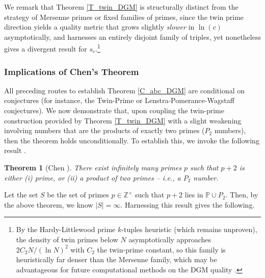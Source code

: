 \documentclass[11pt,letterpaper]{amsart}
\newtheorem{theorem}{Theorem}[section]
\def\Z{\mathbb{Z}}
\def\Z{\mathbb{Z}}
\begin{document}
We remark that Theorem \ref{T_twin_DGM} is structurally distinct from the strategy of Mersenne primes or fixed families of primes, since the twin prime direction yields a quality metric that grows slightly \textit{slower} in $\ln(c)$ asymptotically, and harnesses an entirely disjoint family of triples, yet nonetheless gives a divergent result for $s_c$.\footnote{By the Hardy-Littlewood prime $k$-tuples heuristic (which remains unproven), the density of twin primes below $N$ asymptotically approaches $2 C_2 N/(\ln N)^2$ with $C_2$ the twin-prime constant, so this family is heuristically far denser than the Mersenne family, which may be advantageous for future computational methods on the DGM quality \cite{hardy1923some}.}

\subsubsection{Implications of Chen's Theorem}
\label{S_chen}
All preceding routes to establish Theorem \ref{C_abc_DGM} are conditional on conjectures (for instance, the Twin-Prime or Lenstra-Pomerance-Wagstaff conjectures). We now demonstrate that, upon coupling the twin-prime construction provided by Theorem \ref{T_twin_DGM} with a slight weakening involving numbers that are the products of exactly two primes ($P_2$ numbers), then the theorem holds unconditionally. To establish this, we invoke the following result \cite{chen1973}.

\begin{theorem}[Chen \cite{chen1973}]\label{T_Chen}
There exist infinitely many primes $p$ such that $p+2$ is either (i) prime, or (ii) a product of two primes – i.e., a $P_2$ number.
\end{theorem}

Let the set $S$ be the set of primes $p \in \Z^{+}$ such that $p + 2$ lies in $\mathbb{P} \cup P_2$. Then, by the above theorem, we know $|S|=\infty$. Harnessing this result gives the following.
\end{document}
